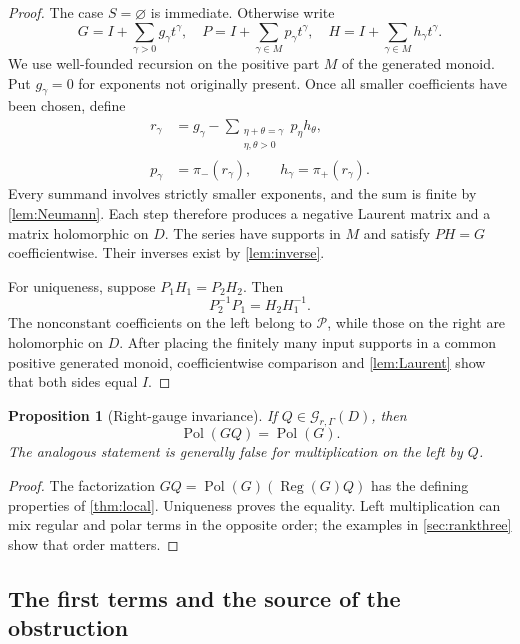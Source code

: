 \documentclass[11pt,letterpaper]{article}
\newtheorem{proposition}[proposition]{Proposition}
\theoremstyle{definition}
\theoremstyle{remark}
\newcommand{\GG}{\mathscr G_{r,\Gamma}}
\newcommand{\Pol}{\operatorname{Pol}}
\newcommand{\Reg}{\operatorname{Reg}}
\newcommand{\PP}{\mathcal P}
\numberwithin{equation}{section}
\begin{document}
\begin{proof}
The case $S=\varnothing$ is immediate. Otherwise write
\[
 G=I+\sum_{\gamma>0}g_\gamma t^\gamma,
 \quad P=I+\sum_{\gamma\in M}p_\gamma t^\gamma,
 \quad H=I+\sum_{\gamma\in M}h_\gamma t^\gamma.
\]
We use well-founded recursion on the positive part $M$ of the generated monoid. Put $g_\gamma=0$ for exponents not originally present. Once all smaller coefficients have been chosen, define
\begin{align}
 r_\gamma
   &=g_\gamma-
       \sum_{\substack{\eta+\theta=\gamma\\\eta,\theta>0}}
         p_\eta h_\theta,\label{eq:factorrecursion1}\\
 p_\gamma&=\pi_-(r_\gamma),\qquad
 h_\gamma=\pi_+(r_\gamma).\label{eq:factorrecursion2}
\end{align}
Every summand involves strictly smaller exponents, and the sum is finite by \cref{lem:Neumann}. Each step therefore produces a negative Laurent matrix and a matrix holomorphic on $D$. The series have supports in $M$ and satisfy $PH=G$ coefficientwise. Their inverses exist by \cref{lem:inverse}.

For uniqueness, suppose $P_1H_1=P_2H_2$. Then
\[
 P_2^{-1}P_1=H_2H_1^{-1}.
\]
The nonconstant coefficients on the left belong to $\PP$, while those on the right are holomorphic on $D$. After placing the finitely many input supports in a common positive generated monoid, coefficientwise comparison and \cref{lem:Laurent} show that both sides equal $I$.
\end{proof}

\begin{proposition}[Right-gauge invariance]\label{prop:rightgauge}
If $Q\in\GG(D)$, then
\begin{equation}\label{eq:rightgauge}
 \Pol(GQ)=\Pol(G).
\end{equation}
The analogous statement is generally false for multiplication on the left by $Q$.
\end{proposition}

\begin{proof}
The factorization $GQ=\Pol(G)(\Reg(G)Q)$ has the defining properties of \cref{thm:local}. Uniqueness proves the equality. Left multiplication can mix regular and polar terms in the opposite order; the examples in \cref{sec:rankthree} show that order matters.
\end{proof}

\subsection{The first terms and the source of the obstruction}
\end{document}
